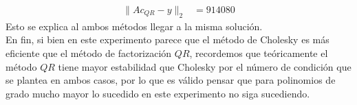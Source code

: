 \begin{homeworkProblem}
\begin{solucion}
\begin{align*}
      \|Ac_{QR}-y\|_{2}&= 914080
    \end{align*}
    Esto se explica al ambos métodos llegar a la misma solución.\\
    En fin, si bien en este experimento parece que el método de Cholesky es más eficiente que el método de factorización $QR$, recordemos que teóricamente el método $QR$ tiene mayor estabilidad que Cholesky por el número de condición que se plantea en ambos casos, por lo que es válido pensar que para polinomios de grado mucho mayor lo sucedido en este experimento no siga sucediendo. 
  \end{solucion}
\end{homeworkProblem}
